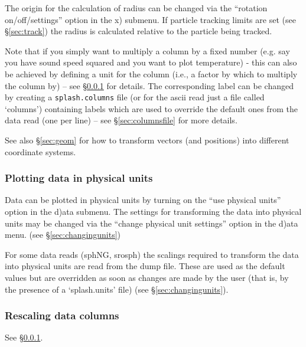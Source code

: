 \documentclass[a4paper,10pt]{article}
\begin{document}
 The origin for the calculation of radius can be changed via the ``rotation on/off/settings'' option in the x) submenu. If particle tracking limits are set (see \S\ref{sec:track}) the radius is calculated relative to the particle being tracked.
  
 Note that if you simply want to multiply a column by a fixed number (e.g. say you have sound speed squared and you want to plot temperature) - this can also be achieved by defining a unit for the column (i.e., a factor by which to multiply the column by) -- see \S\ref{sec:physicalunits} for details. The corresponding label can be changed by creating a \verb+splash.columns+ file (or for the ascii read just a file called `columns') containing labels which are used to override the default ones from the data read (one per line) -- see \S\ref{sec:columnsfile} for more details.

See also \S\ref{sec:geom} for how to transform vectors (and positions) into different coordinate systems.

\subsubsection{ Plotting data in physical units}
\label{sec:physicalunits}
 Data can be plotted in physical units by turning on the ``use physical units'' option in the d)ata submenu. The settings for transforming the data into physical units may be changed via the ``change physical unit settings'' option in the d)ata menu. (see \S\ref{sec:changingunits})

 For some data reads (sphNG, srosph) the scalings required to transform the data into physical units are read from the dump file. These are used as the default values but are overridden as soon as changes are made by the user (that is, by the presence of a `splash.units' file) (see \S\ref{sec:changingunits}).
 
\subsubsection{ Rescaling data columns}
See \S\ref{sec:physicalunits}.
\end{document}
